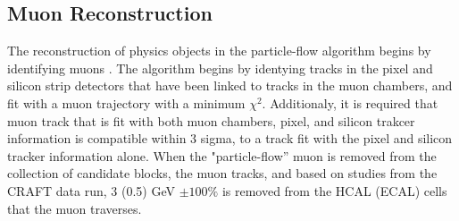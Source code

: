 \subsection{Muon Reconstruction}
\label{muon_reco_overview}

\par The reconstruction of physics objects in the particle-flow
algorithm begins by identifying muons \cite{CMS-PAS-PFT-09-001}.  The
algorithm begins by identying tracks in the pixel and silicon strip
detectors that have been linked to tracks in the muon chambers, and
fit with a muon trajectory with a minimum $\chi^{2}$.  Additionaly, it
is required that muon track that is fit with both muon chambers,
pixel, and silicon trakcer information is compatible within 3 sigma,
to a track fit with the pixel and silicon tracker information alone.
When the "particle-flow'' muon is removed from the collection of
candidate blocks, the muon tracks, and based on studies from the CRAFT
data run, 3 (0.5) GeV $\pm 100\%$ is removed from the HCAL (ECAL)
cells that the muon traverses.  

